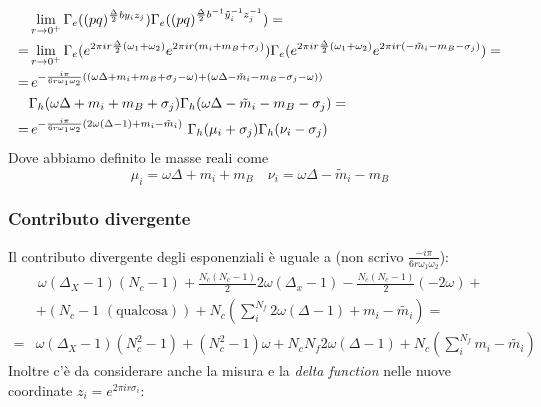 \documentclass[a4paper,12pt]{article}
\begin{document}
\begin{align*}
& \lim_{r \rightarrow 0^+} \Gamma_e(
(pq)^{\frac{\Delta}{2} b y_i z_j }) \Gamma_e(
(pq)^{\frac{\Delta}{2} b^{-1} \tilde y_i^{-1} z_j^{-1} })  = \\
=& \lim_{r \rightarrow 0^+ } \Gamma_e( e^{2 \pi i  r  {\Delta \over 2} (\omega_1 + \omega_2)} e^{2 \pi i r ( m_i + m_B + \sigma_j) })\Gamma_e( e^{2 \pi i r  {\Delta \over 2} (\omega_1 + \omega_2)} e^{2 \pi i r ( -\tilde m_i - m_B - \sigma_j) }) = \\
= &  \,e^{- \frac{i \pi} {6 r \omega_1 \omega_2 }  ( ( \omega \Delta + m_i + m_B + \sigma_j -  \omega) + ( \omega \Delta -\tilde m_i - m_B - \sigma_j -  \omega))} \, \\
& \Gamma_h ( \omega \Delta + m_i + m_B + \sigma_j) \Gamma_h ( \omega \Delta - \tilde m_i - m_B - \sigma_j) = \\
=&\, e^{- \frac{i \pi} {6 r \omega_1 \omega_2 }  ( 2 \omega (\Delta - 1) + m_i - \tilde m_i )} \, \, \Gamma_h ( \mu_i + \sigma_j) \Gamma_h ( \nu_i - \sigma_j)
\end{align*}
Dove abbiamo definito le masse reali come
$$
 \mu_i = \omega \Delta + m_i + m_B  \quad  \nu_i = \omega \Delta - \tilde m_i - m_B
$$
\subsubsection{Contributo divergente}
Il contributo divergente degli esponenziali è uguale a (non scrivo $ \frac{- i \pi}{6 r \omega_1 \omega_2} $):
\begin{align*}
& \, \omega (\Delta_X - 1) ( N_c - 1) + \frac{N_c(N_c -1)}{2} 2 \omega(\Delta_x - 1) - \frac{N_c(N_c -1)}{2}  ( - 2 \omega)  +\\
&+ (N_c - 1  \, \,(\mbox{qualcosa} )) + N_c ( \sum_i^{N_f} 2 \omega(\Delta - 1 ) + m_i - \tilde{m_i}) = \\
= &  \omega (\Delta_X - 1) ( N_c^2 - 1) + (N_c^2 -1) \omega + N_c N_f 2 \omega(\Delta - 1) + N_c (\sum_{i}^{N_f}  m_i - \tilde{m_i} )
\end{align*}
Inoltre c'è da considerare anche la misura e la \emph{delta function} nelle nuove coordinate $ z_i = e^{2 \pi i r \sigma_i }$:
\end{document}
